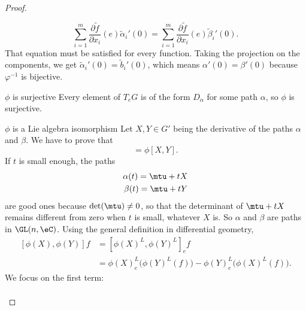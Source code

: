 \begin{proof}
\begin{subproof}
            \begin{equation}
                \sum_{i=1}^m\frac{ \partial \tilde f }{ \partial x_i }(e)\tilde \alpha_i'(0)=\sum_{i=1}^m\frac{ \partial \tilde f }{ \partial x_i }(e)\tilde \beta_i'(0).
            \end{equation}
            That equation must be satisfied for every function. Taking the projection on the components, we get \( \tilde \alpha_i'(0)=\tilde b_i'(0)\), which means \( \alpha'(0)=\beta'(0)\) because \( \varphi^{-1}\) is bijective.
        \item[\( \phi\) is surjective]
            Every element of \( T_eG\) is of the form \( D_{\alpha}\) for some path \( \alpha\), so \( \phi\) is surjective.
        \item[\( \phi\) is a Lie algebra isomorphism]
            Let \( X,Y\in G'\) being the derivative of the paths \( \alpha\) and \( \beta\). We have to prove that
            \begin{equation}
                [\phi(X),\phi(Y)]=\phi[X,Y].
            \end{equation}
            If \( t\) is small enough, the paths
            \begin{subequations}
                \begin{align}
                    \alpha(t)=\mtu+tX\\
                    \beta(t)=\mtu+tY\\
                \end{align}
            \end{subequations}
            are good ones because \( \det(\mtu)\neq 0\), so that the determinant of \( \mtu+tX\) remains different from zero when \( t\) is small, whatever \( X\) is. So \( \alpha\) and \( \beta\) are paths in \( \GL(n,\eC)\). Using the general definition in differential geometry,
            \begin{subequations}        \label{SUBEQSooCYRDooFOdLrn}
                \begin{align}
                    [\phi(X),\phi(Y)]f&=[\phi(X)^L,\phi(Y)^L]_ef\\
                    &=\phi(X)^L_e\big( \phi(Y)^L(f) \big)-\phi(Y)^L_e\big( \phi(X)^L(f) \big) \label{SUBEQooOPUAooZYsZlX}.
                \end{align}
            \end{subequations}
            We focus on the first term:
            \begin{subequations}        \label{SUBEQooTUNFooFkDmuP}
                \begin{align}

\end{align}
\end{subequations}
\end{subproof}
\end{proof}
